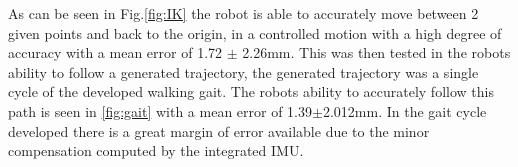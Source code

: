 \documentclass[12pt]{report}
\begin{document}
As can be seen in Fig.\ref{fig:IK} the robot is able to accurately move between 2 given points and back to the origin, in a controlled motion with a high degree of accuracy with a mean error of 1.72 $\pm$ 2.26mm. This was then tested in the robots ability to follow a generated trajectory, the generated trajectory was a single cycle of the developed walking gait. The robots ability to accurately follow this path is seen in \ref{fig:gait} with a mean error of 1.39$\pm$2.012mm. In the gait cycle developed there is a great margin of error available due to the minor compensation computed by the integrated IMU.

\begin{figure}[H]
    \centering
\end{figure}
\end{document}
